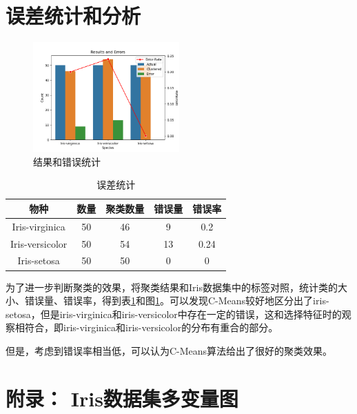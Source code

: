 \documentclass[a4paper,twoside]{article}
\begin{document}
\begin{spacing}{1.2}
\section{误差统计和分析}

\begin{figure}[h] 
	\centering
	\includegraphics[width=0.5\textwidth]{../errors.png} 
	\caption{结果和错误统计}
	\label{Fig.error}
\end{figure}

\begin{table}[h]
	\caption{误差统计}
	\label{tbl:sta}
	\begin{center}
		\begin{tabular}{ccccc}
			\toprule  
			物种& 数量& 聚类数量 &错误量 &错误率\\
			\midrule 
			Iris-virginica& 50& 46 & 9 &0.2\\
			Iris-versicolor& 50& 54 & 13 & 0.24\\
			Iris-setosa&50 &50 &0 &0 \\
			\bottomrule 
		\end{tabular}
	\end{center}
\end{table}


为了进一步判断聚类的效果，将聚类结果和Iris数据集中的标签对照，统计类的大小、错误量、错误率，得到表\ref{tbl:sta}和图\ref{Fig.error}。可以发现C-Means较好地区分出了iris-setosa，但是iris-virginica和iris-versicolor中存在一定的错误，这和选择特征时的观察相符合，即iris-virginica和iris-versicolor的分布有重合的部分。

但是，考虑到错误率相当低，可以认为C-Means算法给出了很好的聚类效果。


\appendix

\section{附录： Iris数据集多变量图}
\label{sec:appA}


\end{spacing}
\end{document}
